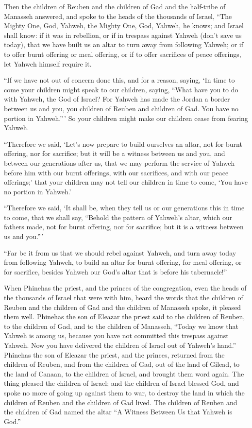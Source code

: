  Then the children of Reuben and the children of Gad and
the half-tribe of Manasseh answered, and spoke to the heads of the
thousands of Israel,  ``The Mighty One, God, Yahweh, the
Mighty One, God, Yahweh, he knows; and Israel shall know: if it was in
rebellion, or if in trespass against Yahweh (don't save us today),
 that we have built us an altar to turn away from following
Yahweh; or if to offer burnt offering or meal offering, or if to offer
sacrifices of peace offerings, let Yahweh himself require it.

 ``If we have not out of concern done this, and for a
reason, saying, `In time to come your children might speak to our
children, saying, ``What have you to do with Yahweh, the God of Israel?
 For Yahweh has made the Jordan a border between us and
you, you children of Reuben and children of Gad. You have no portion in
Yahweh.''\,' So your children might make our children cease from fearing
Yahweh.

 ``Therefore we said, `Let's now prepare to build ourselves
an altar, not for burnt offering, nor for sacrifice;  but
it will be a witness between us and you, and between our generations
after us, that we may perform the service of Yahweh before him with our
burnt offerings, with our sacrifices, and with our peace offerings;'
that your children may not tell our children in time to come, `You have
no portion in Yahweh.'

 ``Therefore we said, `It shall be, when they tell us or
our generations this in time to come, that we shall say, ``Behold the
pattern of Yahweh's altar, which our fathers made, not for burnt
offering, nor for sacrifice; but it is a witness between us and
you.''\,'

 ``Far be it from us that we should rebel against Yahweh,
and turn away today from following Yahweh, to build an altar for burnt
offering, for meal offering, or for sacrifice, besides Yahweh our God's
altar that is before his tabernacle!''

 When Phinehas the priest, and the princes of the
congregation, even the heads of the thousands of Israel that were with
him, heard the words that the children of Reuben and the children of Gad
and the children of Manasseh spoke, it pleased them well. 
Phinehas the son of Eleazar the priest said to the children of Reuben,
to the children of Gad, and to the children of Manasseh, ``Today we know
that Yahweh is among us, because you have not committed this trespass
against Yahweh. Now you have delivered the children of Israel out of
Yahweh's hand.''  Phinehas the son of Eleazar the priest,
and the princes, returned from the children of Reuben, and from the
children of Gad, out of the land of Gilead, to the land of Canaan, to
the children of Israel, and brought them word again.  The
thing pleased the children of Israel; and the children of Israel blessed
God, and spoke no more of going up against them to war, to destroy the
land in which the children of Reuben and the children of Gad lived.
 The children of Reuben and the children of Gad named the
altar ``A Witness Between Us that Yahweh is God.''

